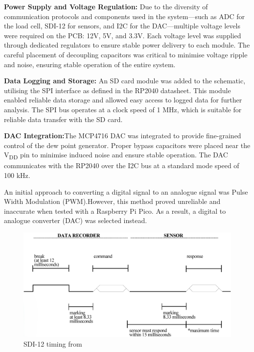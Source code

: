 \textbf{Power Supply and Voltage Regulation:} Due to the diversity of communication protocols and components used in the system—such as ADC for the load cell, SDI-12 for sensors, and I2C for the DAC—multiple voltage levels were required on the PCB: 12V, 5V, and 3.3V. Each voltage level was supplied through dedicated regulators to ensure stable power delivery to each module. The careful placement of decoupling capacitors was critical to minimise voltage ripple and noise, ensuring stable operation of the entire system.

\textbf{Data Logging and Storage:} An SD card module was added to the schematic, utilising the SPI interface as defined in the RP2040 datasheet. This module enabled reliable data storage and allowed easy access to logged data for further analysis. The SPI bus operates at a clock speed of 1 MHz, which is suitable for reliable data transfer with the SD card.

\textbf{DAC Integration:}The MCP4716 DAC was integrated to provide fine-grained control of the dew point generator. Proper bypass capacitors were placed near the V\textsubscript{DD} pin to minimise induced noise and ensure stable operation. The DAC communicates with the RP2040 over the I2C bus at a standard mode speed of 100 kHz.

An initial approach to converting a digital signal to an analogue signal was Pulse Width Modulation (PWM).However, this method proved unreliable and inaccurate when tested with a Raspberry Pi Pico. As a result, a digital to analogue converter (DAC) was selected instead.

\begin{figure}
    \includegraphics[width=\linewidth]{figures/SDI-12_timing.png}
    \caption{SDI-12 timing from \cite{sdi12_datasheet}}
    \label{sdi12_timing}
\end{figure}


